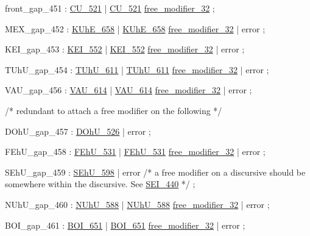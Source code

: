 \label{html:y451}
front_gap_451           :  \hyperref[html:y521]{CU_521}
                        |  \hyperref[html:y521]{CU_521}  \hyperref[html:y32]{free_modifier_32}
                        ;

\label{html:y452}
MEX_gap_452             :  \hyperref[html:y658]{KUhE_658}
                        |  \hyperref[html:y658]{KUhE_658}  \hyperref[html:y32]{free_modifier_32}
                        |  error
                        ;

\label{html:y453}
KEI_gap_453             :  \hyperref[html:y552]{KEI_552}
                        |  \hyperref[html:y552]{KEI_552}  \hyperref[html:y32]{free_modifier_32}
                        |  error
                        ;

\label{html:y454}
TUhU_gap_454            :  \hyperref[html:y611]{TUhU_611}
                        |  \hyperref[html:y611]{TUhU_611}  \hyperref[html:y32]{free_modifier_32}
                        |  error
                        ;

\label{html:y456}
VAU_gap_456             :  \hyperref[html:y614]{VAU_614}
                        |  \hyperref[html:y614]{VAU_614}  \hyperref[html:y32]{free_modifier_32}
                        |  error
                        ;

/* redundant to attach a free modifier on the following */

\label{html:y457}
DOhU_gap_457            :  \hyperref[html:y526]{DOhU_526}
                        |  error
                        ;

\label{html:y458}
FEhU_gap_458            :  \hyperref[html:y531]{FEhU_531}
                        |  \hyperref[html:y531]{FEhU_531}  \hyperref[html:y32]{free_modifier_32}
                        |  error
                        ;

\label{html:y459}
SEhU_gap_459            :  \hyperref[html:y598]{SEhU_598}
                        |  error
/* a free modifier on a discursive should be somewhere within the discursive.
   See \hyperref[html:y440]{SEI_440} */
                        ;

\label{html:y460}
NUhU_gap_460            :  \hyperref[html:y588]{NUhU_588}
                        |  \hyperref[html:y588]{NUhU_588}  \hyperref[html:y32]{free_modifier_32}
                        |  error
                        ;

\label{html:y461}
BOI_gap_461             :  \hyperref[html:y651]{BOI_651}
                        |  \hyperref[html:y651]{BOI_651}  \hyperref[html:y32]{free_modifier_32}
                        |  error
                        ;

